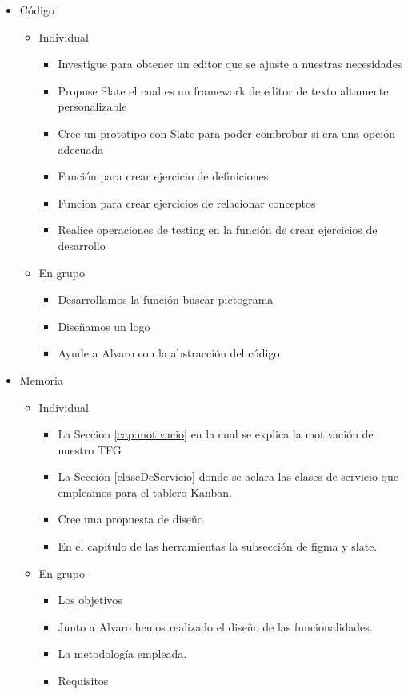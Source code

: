 \begin{itemize}
    \item Código
        \begin{itemize}
            \item Individual
                \begin{itemize}
                    \item Investigue para obtener un editor que se ajuste a nuestras necesidades
                    \item Propuse Slate el cual es un framework de editor de texto altamente personalizable 
                    \item Cree un prototipo con Slate para poder combrobar si era una opción adecuada
                    \item Función para crear ejercicio de definiciones
                    \item Funcion para crear ejercicios de relacionar conceptos
                    \item Realice operaciones de testing en la función de crear ejercicios de desarrollo
                \end{itemize}
            \item En grupo
                \begin{itemize}
                    \item Desarrollamos la función buscar pictograma
                    \item Diseñamos un logo
                    \item Ayude a Alvaro con la abstracción del código
                \end{itemize}
        \end{itemize}
    \item Memoria
    \begin{itemize}
        \item Individual
            \begin{itemize}
                \item La Seccion \ref{cap:motivacio} en la cual se explica la motivación de nuestro TFG
                \item La Sección \ref{claseDeServicio} donde se aclara las clases de servicio que empleamos para el tablero Kanban.
                \item Cree una propuesta de diseño
                \item En el capitulo de las herramientas la subsección de figma y slate.
            \end{itemize}
        \item En grupo
            \begin{itemize}
                \item Los objetivos
                \item Junto a Alvaro hemos realizado el diseño de las funcionalidades.
                \item La metodología empleada.
                \item Requisitos
            \end{itemize}
    \end{itemize}
\end{itemize}